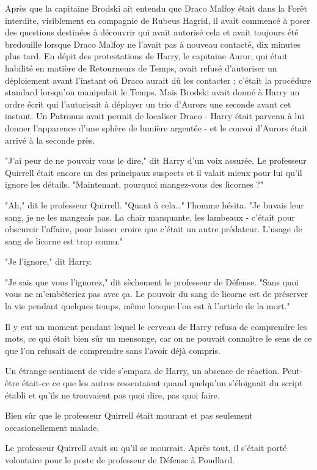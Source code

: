 Après que la capitaine Brodski ait entendu que Draco Malfoy était dans la Forêt interdite, visiblement en compagnie de Rubeus Hagrid, il avait commencé à poser des questions destinées à découvrir qui avait autorisé cela et avait toujours été bredouille lorsque Draco Malfoy ne l'avait pas à nouveau contacté, dix minutes plus tard. En dépit des protestations de Harry, le capitaine Auror, qui était habilité en matière de Retourneurs de Temps, avait refusé d'autoriser un déploiement avant l'instant où Draco aurait dû les contacter ; c'était la procédure standard lorsqu'on manipulait le Temps. Mais Brodski avait donné à Harry un ordre écrit qui l'autorisait à déployer un trio d'Aurors une seconde avant cet instant. Un Patronus avait permit de localiser Draco - Harry était parvenu à lui donner l'apparence d'une sphère de lumière argentée - et le convoi d'Aurors était arrivé à la seconde près.

"J'ai peur de ne pouvoir vous le dire," dit Harry d'un voix assurée. Le professeur Quirrell était encore un des principaux suspects et il valait mieux pour lui qu'il ignore les détails. "Maintenant, pourquoi mangez-vous des licornes ?"

"Ah," dit le professeur Quirrell. "Quant à cela…" l'homme hésita. "Je buvais leur sang, je ne les mangeais pas. La chair manquante, les lambeaux - c'était pour obscurcir l'affaire, pour laisser croire que c'était un autre prédateur. L'usage de sang de licorne est trop connu."

"Je l'ignore," dit Harry.

"Je sais que vous l'ignorez," dit sèchement le professeur de Défense. "Sans quoi vous ne m'embêteriez pas avec ça. Le pouvoir du sang de licorne est de préserver la vie pendant quelques temps, même lorsque l'on est à l'article de la mort."

Il y eut un moment pendant lequel le cerveau de Harry refusa de comprendre les mots, ce qui était bien sûr un mensonge, car on ne pouvait connaître le sens de ce que l'on refusait de comprendre sans l'avoir déjà compris.

Un étrange sentiment de vide s'empara de Harry, un absence de réaction. Peut-être était-ce ce que les autres ressentaient quand quelqu'un s'éloignait du script établi et qu'ils ne trouvaient pas quoi dire, pas quoi faire.

Bien sûr que le professeur Quirrell était mourant et pas seulement occasionellement malade.

Le professeur Quirrell avait su qu'il se mourrait. Après tout, il s'était porté volontaire pour le poste de professeur de Défense à Poudlard.

